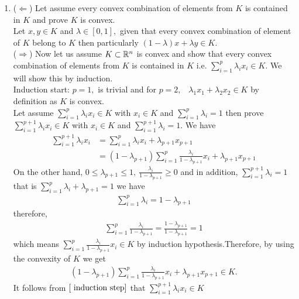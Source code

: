 \documentclass{ExerciseSheet}
\newif\ifsolutions
\begin{document}
\ifsolutions
\vskip 0.3cm

\begin{solution}
\begin{enumerate}
    \item ($\Leftarrow$) Let assume every convex combination of elements from $K$ is contained in $K$ and prove $K$ is convex.\\
    Let $x,y\in K$ and $\lambda\in [0, 1],$ given that every convex combination of element of $K$ belong to $K$ then particularly $(1-\lambda)x+\lambda y\in K.$\\
    ($\Rightarrow$) Now let us assume $K\subset \mathbb{R}^n$ is convex and show that every convex combination of elements from $K$ is contained in $K$ i.e. $\displaystyle \sum_{i=1}^{p}\lambda_ix_i\in K.$ We will show this by induction.\\
    Induction start:  $p=1,$ is trivial and for $p=2,$~ $\lambda_1x_1+\lambda_2x_2\in K$ by definition as $K$ is convex.\\
    Let assume $\displaystyle \sum_{i=1}^{p}\lambda_ix_i\in K$ with $x_i\in K$ and $\displaystyle \sum_{i=1}^{p}\lambda_i=1$ then prove $\displaystyle \sum_{i=1}^{p+1}\lambda_ix_i\in K$ with $x_i\in K$ and $\displaystyle \sum_{i=1}^{p+1}\lambda_i=1.$
    We have
      \begin{align}
          \sum_{i=1}^{p+1}\lambda_ix_i&= \sum_{i=1}^{p}\lambda_ix_i+\lambda_{p+1}x_{p+1}\nonumber\\
                           &=(1-\lambda_{p+1})\sum_{i=1}^{p}\frac{\lambda_i}{1-\lambda_{p+1}}x_i+\lambda_{p+1}x_{p+1} \label{ induction step}
      \end{align}
    On the other hand, $0\leq \lambda_{p+1}\leq 1,~\frac{\lambda_i}{1-\lambda_{p+1}}\geq0$ and in addition, $\displaystyle \sum_{i=1}^{p+1}\lambda_i=1$ that is $\displaystyle \sum_{i=1}^{p}\lambda_i+ \lambda_{p+1}=1$ we have
    \begin{align*}
        \sum_{i=1}^{p}\lambda_i=1-\lambda_{p+1}
    \end{align*}
   therefore,
   \begin{align*}
        \sum_{i=1}^{p}\frac{\lambda_i}{1-\lambda_{p+1}}=\frac{1-\lambda_{p+1}}{1-\lambda_{p+1}}=1
    \end{align*}
 which means $\displaystyle \sum_{i=1}^{p}\frac{\lambda_i}{1-\lambda_{p+1}}x_i\in K$ by induction hypothesis.Therefore, by using the convexity of $K$ we get 
  \begin{align*}
      (1-\lambda_{p+1})\sum_{i=1}^{p}\frac{\lambda_i}{1-\lambda_{p+1}}x_i+\lambda_{p+1}x_{p+1}\in K.
  \end{align*}
 It follows from $\eqref{ induction step}$ that $\displaystyle \sum_{i=1}^{p+1}\lambda_ix_i\in K$
 





\end{enumerate}
\end{solution}
\end{document}
